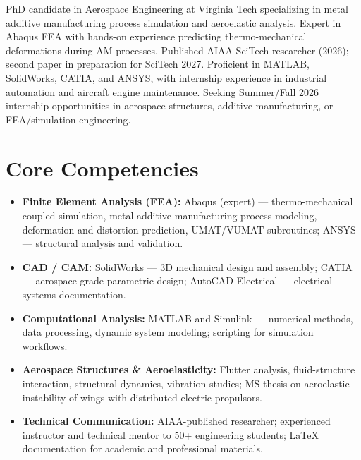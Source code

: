 \documentclass[11pt,a4paper]{moderncv}
\begin{document}
\makecvtitle


\vspace{6pt}
\small{PhD candidate in Aerospace Engineering at Virginia Tech specializing in metal additive manufacturing process simulation and aeroelastic analysis. Expert in Abaqus FEA with hands-on experience predicting thermo-mechanical deformations during AM processes. Published AIAA SciTech researcher (2026); second paper in preparation for SciTech 2027. Proficient in MATLAB, SolidWorks, CATIA, and ANSYS, with internship experience in industrial automation and aircraft engine maintenance. Seeking Summer/Fall 2026 internship opportunities in aerospace structures, additive manufacturing, or FEA/simulation engineering.}


\section{Core Competencies}
\vspace{1pt}
\begin{itemize}

\item \textbf{Finite Element Analysis (FEA):} Abaqus (expert) — thermo-mechanical coupled simulation, metal additive manufacturing process modeling, deformation and distortion prediction, UMAT/VUMAT subroutines; ANSYS — structural analysis and validation.
\vspace{1pt}

\item \textbf{CAD / CAM:} SolidWorks — 3D mechanical design and assembly; CATIA — aerospace-grade parametric design; AutoCAD Electrical — electrical systems documentation.
\vspace{1pt}

\item \textbf{Computational Analysis:} MATLAB and Simulink — numerical methods, data processing, dynamic system modeling; scripting for simulation workflows.
\vspace{1pt}

\item \textbf{Aerospace Structures \& Aeroelasticity:} Flutter analysis, fluid-structure interaction, structural dynamics, vibration studies; MS thesis on aeroelastic instability of wings with distributed electric propulsors.
\vspace{1pt}

\item \textbf{Technical Communication:} AIAA-published researcher; experienced instructor and technical mentor to 50+ engineering students; LaTeX documentation for academic and professional materials.

\end{itemize}
\end{document}
